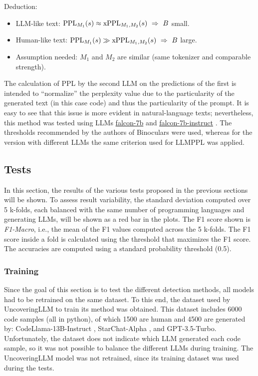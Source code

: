 Deduction:
\begin{itemize}
\item LLM-like text: $\mathrm{PPL}_{M_1}(s)\approx \mathrm{xPPL}_{M_1,M_2}(s)\ \Rightarrow\ B$ small.
\item Human-like text: $\mathrm{PPL}_{M_1}(s)\gg \mathrm{xPPL}_{M_1,M_2}(s)\ \Rightarrow\ B$ large.
\item Assumption needed: $M_1$ and $M_2$ are similar (same tokenizer and comparable strength).
\end{itemize}
The calculation of PPL by the second LLM on the predictions of 
the first is intended to “normalize” the perplexity value due to 
the particularity of the generated text (in this case code) and thus 
the particularity of the prompt. It is easy to see that this issue 
is more evident in natural-language texts; nevertheless, this 
method was tested using LLMs 
\href{https://huggingface.co/tiiuae/falcon-7b}{falcon-7b} and 
\href{https://huggingface.co/tiiuae/falcon-7b-instruct}{falcon-7b-instruct}
\cite{falcon40b}. The thresholds recommended by the 
authors of Binoculars were used, whereas for the version with different 
LLMs the same criterion used for LLMPPL was applied.







\clearpage
\subsection{Tests}
In this section, the results of the various tests proposed in the previous sections will be shown.
To assess result variability, the standard deviation computed over 5 k-folds, 
each balanced with the same number of programming languages and generating 
LLMs, will be shown as a red bar in the plots.
The F1 score shown is \textit{F1-Macro}, i.e., the mean of the F1 values computed across the 5 k-folds.
The F1 score inside a fold is calculated using the threshold that maximizes the F1 score.
The accuracies are computed using a standard probability threshold (0.5).

\subsubsection{Training}
Since the goal of this section is to test the different detection methods, 
all models had to be retrained on the same dataset. To this end, the dataset 
used by UncoveringLLM \cite{oedingen2024chatgpt} to train its method was obtained. 
This dataset includes 
6000 code samples (all in python), of which 1500 are human and 4500 are generated by: 
CodeLlama-13B-Instruct \cite{roziere2023code}, 
StarChat-Alpha \cite{Tunstall2023starchat-alpha}, 
and GPT-3.5-Turbo. 
Unfortunately, 
the dataset does not indicate which LLM generated each code sample, so it 
was not possible to balance the different LLMs during training. The 
UncoveringLLM model was not retrained, since its training dataset was used 
during the tests.



